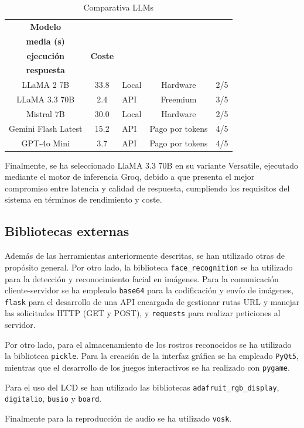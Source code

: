 \begin{table}[H]
\centering
\small
\begin{tabularx}{\textwidth}{|c|c|X|c|X|}
\hline
\textbf{Modelo} &
\makecell{\textbf{Latencia}\\\textbf{media (s)}} &
\makecell{\textbf{Tipo de}\\\textbf{ejecución}} &
\textbf{Coste} &
\makecell{\textbf{Calidad de}\\\textbf{respuesta}} \\
\hline
LLaMA 2 7B & 33.8 & Local & Hardware & 2/5 \\
\hline
LLaMA 3.3 70B & 2.4 & API & Freemium & 3/5 \\
\hline
Mistral 7B & 30.0 & Local & Hardware & 2/5 \\
\hline
Gemini Flash Latest & 15.2 & API & Pago por tokens & 4/5 \\
\hline
GPT-4o Mini & 3.7 & API & Pago por tokens & 4/5 \\
\hline
\end{tabularx}
\caption{Comparativa LLMs}
\label{cuadro:llm}
\end{table}


\vspace{0.2cm}


Finalmente, se ha seleccionado LlaMA 3.3 70B en su variante Versatile, ejecutado mediante el motor de inferencia Groq, debido a que presenta el mejor compromiso entre latencia y calidad de respuesta, cumpliendo los requisitos del sistema en términos de rendimiento y coste.



\subsection{Bibliotecas externas}

Además de las herramientas anteriormente descritas, se han utilizado otras de propósito general. Por otro lado, la biblioteca \verb|face_recognition| se ha utilizado para la detección  y reconocimiento facial en imágenes. Para la comunicación cliente-servidor se ha empleado \verb|base64| para la codificación y envío de imágenes, \verb|flask| para el desarrollo de una API encargada de gestionar rutas URL y manejar las solicitudes HTTP (GET y POST), y \verb|requests| para realizar peticiones al servidor.


Por otro lado, para el almacenamiento de los rostros reconocidos se ha utilizado la biblioteca \verb|pickle|. Para la creación de la interfaz gráfica se ha empleado \verb|PyQt5|, mientras que el desarrollo de los juegos interactivos se ha realizado con \verb|pygame|.

Para el uso del LCD se han utilizado las bibliotecas \verb|adafruit_rgb_display|, \verb|digitalio|, \verb|busio| y \verb|board|.

Finalmente para la reproducción de audio se ha utilizado \verb|vosk|.


